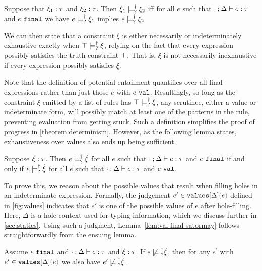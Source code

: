 \begin{definition}
	\label{definition:nn-entailment}
	Suppose that $\xi_1 : \tau$ and $\xi_2 : \tau$. Then $\xi_1 \models_{?}^{\dag} \xi_2$ iff for all $e$ such that $\cdot \mathbin{;} \Delta \vdash e : \tau$ and $e ~\mathtt{final}$ we have $e \models_{?}^{\dag} \xi_1$ implies $e \models_{?}^{\dag} \xi_2$ 
\end{definition}
We can then state that a constraint $\xi$ is either necessarily or indeterminately exhaustive exactly when $\top \models_{?}^{\dag} \xi$, relying on the fact that every expression possibly satisfies the truth constraint $\top$. That is, $\xi$ is not necessarily inexhaustive if every expression possibly satisfies $\xi$. 



Note that the definition of potential entailment quantifies over all final expressions rather than just those $e$ with $e ~\mathtt{val}$. Resultingly, so long as the constraint $\xi$ emitted by a list of rules has $\top \models_{?}^{\dag} \xi$, any scrutinee, either a value or indeterminate form, will possibly match at least one of the patterns in the rule, preventing evaluation from getting stuck. Such a definition simplifies the proof of progress in \autoref{theorem:determinism}. However, as the following lemma states, exhaustiveness over values also ends up being sufficient.

\begin{lemma}
	\label{lem:val-final-satormay}
	Suppose $\dot{\xi} : \tau$. Then $e \models_{?}^{\dag} \dot{\xi}$ for all $e$ such that $\cdot \mathbin{;} \Delta \vdash e : \tau$ and $e ~\mathtt{final}$ if and only if $e \models_{?}^{\dag} \dot{\xi}$ for all $e$ such that $\cdot \mathbin{;} \Delta \vdash e : \tau$ and $e ~\mathtt{val}$.
\end{lemma}

To prove this, we reason about the possible values that result when filling holes in an indeterminate expression. Formally, the judgement $\inValues{e'}{\Delta}{e}$ defined in \autoref{fig:values} indicates that $e'$ is one of the possible values of $e$ after hole-filling. Here, $\Delta$ is a hole context used for typing information, which we discuss further in \autoref{sec:statics}. Using such a judgment, Lemma~\ref{lem:val-final-satormay} follows straightforwardly from the ensuing lemma.

\begin{lemma}
	\label{lem:complete-not-satormay}
	Assume $e ~\mathtt{final}$ and $\cdot \mathbin{;} \Delta \vdash e : \tau$ and
	$\dot{\xi} : \tau$. If $\cnotsatisfyormay{e}{\hxi}$, then for any $e^\prime$ with
	$\inValues{e'}{\Delta}{e}$ we also have $\cnotsatisfyormay{e'}{\hxi}$.
\end{lemma}

